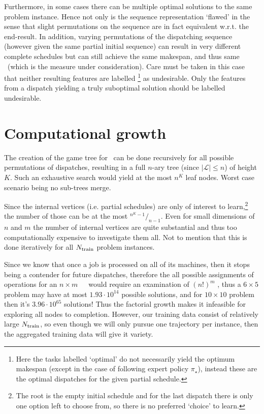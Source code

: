 Furthermore, in some cases there can be multiple optimal solutions to the same 
problem instance. 
Hence not only is the sequence representation `flawed' in the sense that slight 
permutations on the sequence are in fact equivalent w.r.t. the end-result.
In addition, varying permutations of the dispatching sequence (however given 
the same partial initial sequence) can result in very different complete 
schedules but can still achieve the same makespan, and thus same \fullnamerho\ 
(which is the measure under consideration). 
Care must be taken in this case that neither resulting features are labelled 
\footnote{Here the tasks labelled `optimal' do not necessarily yield the
  optimum makespan (except in the case of following expert policy $\pi_\star$), 
  instead these are the optimal dispatches for the given partial schedule.} 
as undesirable. 
Only the features from a dispatch yielding a truly suboptimal solution should 
be labelled undesirable. 

\section{Computational growth}
The creation of the game tree for \JSP\ can be done recursively for all 
possible permutations of dispatches, resulting in a full \mbox{$n$-ary} tree 
(since $|\mathcal{L}|\leq n$) of height $K$. 
Such an exhaustive search would yield at the most $n^K$ leaf nodes. Worst case 
scenario being no sub-trees merge.

\noindent Since the internal vertices (i.e. partial schedules) are only of 
interest to learn,\footnote{The root is the empty initial schedule and for the
  last dispatch there is only one option left to choose from, so there is no 
  preferred `choice' to learn.} 
the number of those can be at the most \mbox{${}^{n^K-1}/_{n-1}$}.
Even for small dimensions of $n$ and $m$ the number of internal vertices are 
quite substantial and thus too computationally expensive to investigate them 
all. Not to mention that this is done iteratively for all $N_{\text{train}}$ 
problem instances.

Since we know that once a job is processed on all of its machines, then it 
stops being a contender for future dispatches, therefore the all possible 
assignments of operations for an $n\times m$~~\JSP\ would require an 
examination of $(n!)^m$ \citep{Giffler60}, thus a $6\times5$ problem may have 
at most $1.93\cdot10^{14}$ possible solutions, and for $10\times10$ problem 
then it's $3.96\cdot10^{65}$ solutions! Thus the factorial growth makes it 
infeasible for exploring all nodes to completion. However, our training data 
consist of relatively large $N_{\text{train}}$, so even though we will only 
pursue one trajectory per instance, then the aggregated training data will give 
it variety.

